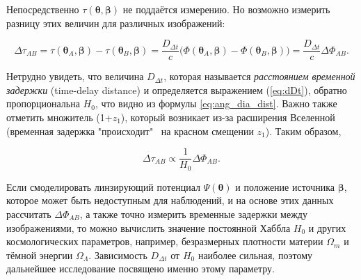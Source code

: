 Непосредственно $\tau(\boldsymbol{\theta}, \boldsymbol{\beta})$ не поддаётся измерению. Но возможно измерить разницу этих величин для различных изображений:

\begin{equation}\label{eq:deltat}
\Delta \tau_{AB} = \tau(\boldsymbol{\theta}_A, \boldsymbol{\beta}) - \tau(\boldsymbol{\theta}_B, \boldsymbol{\beta}) = \frac{D_{\Delta t}}{c}  \Big( \Phi(\boldsymbol{\theta}_A, \boldsymbol{\beta}) - \Phi(\boldsymbol{\theta}_B, \boldsymbol{\beta}) \Big) = \frac{D_{\Delta t}}{c}  \Delta \Phi_{AB}.
\end{equation}

Нетрудно увидеть, что величина $D_{\Delta t}$, которая называется \textit{расстоянием временной задержки} (time-delay distance) и  определяется выражением (\ref{eq:dDt}), обратно пропорциональна $H_0$, что видно из формулы \eqref{eq:ang_dia_dist}. Важно также отметить множитель (1+$z_1$), который возникает из-за расширения Вселенной (временная задержка "происходит" \ на красном смещении $z_1$). Таким образом,

\begin{equation}\label{eq:dt}
\Delta \tau_{AB} \propto \frac{1}{H_0}\Delta \Phi_{AB}.
\end{equation}



Если смоделировать линзирующий потенциал $\Psi(\boldsymbol{\theta})$ и положение источника $\boldsymbol{\beta}$, которое может быть недоступным для наблюдений, и на основе этих данных рассчитать $\Delta \Phi_{AB}$, а также точно измерить временные задержки между изображениями, то можно вычислить значение постоянной Хаббла $H_0$ и других космологических параметров, например, безразмерных плотности материи $\Omega_m$ и тёмной энергии $\Omega_{\Lambda}$. Зависимость $D_{\Delta t}$ от $H_0$ наиболее сильная, поэтому дальнейшее исследование посвящено именно этому параметру.

